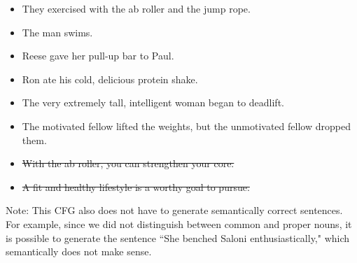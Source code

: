 \documentclass{article}
\begin{document}
\begin{tcolorbox}[enhanced,interior style={top color=Dandelion!20,bottom color=Dandelion!30}]
\begin{itemize}
\begin{itemize}
                \item They exercised with the ab roller and the jump rope.
                \item The man swims.
                \item Reese gave her pull-up bar to Paul.
                \item Ron ate his cold, delicious protein shake.
                \item The very extremely tall, intelligent woman began to deadlift.
                \item The motivated fellow lifted the weights, but the unmotivated fellow dropped them.
                \item \st{With the ab roller, you can strengthen your core.}
                \item \st{A fit and healthy lifestyle is a worthy goal to pursue.}
            \end{itemize}

            Note: This CFG also does not have to generate semantically correct sentences. For example, since we did not distinguish between common and proper nouns, it is possible to generate the sentence ``She benched Saloni enthusiastically," which semantically does not make sense.
        \end{itemize}
\end{tcolorbox}




\end{document}
